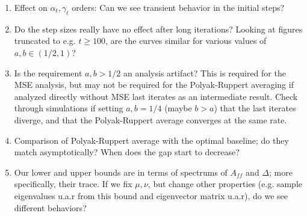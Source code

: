 \begin{enumerate}
\begin{enumerate}
        
        \item Effect on $\alpha_t, \gamma_t$ orders: Can we see transient behavior in the initial steps? 
        \item Do the step sizes really have no effect after long iterations? Looking at figures truncated to e.g. $t \geq 100$, are the curves similar for various values of $a, b \in (1/2, 1)$?
        \item Is the requirement $a, b > 1/2$ an analysis artifact? 
        This is required for the MSE analysis, but may not be required for the Polyak-Ruppert averaging if analyzed directly without MSE last iterates as an intermediate result. 
        Check through simulations if setting $a, b = 1/4$ (maybe $b > a$) that the last iterates diverge, and that the Polyak-Ruppert average converges at the same rate. 
        \item Comparison of Polyak-Ruppert average with the optimal baseline; do they match asymptotically? When does the gap start to decrease?
        \item Our lower and upper bounds are in terms of spectrums of $A_{ff}$ and $\Delta$; more specifically, their trace. 
        If we fix $\mu, \nu$, but change other properties (e.g. sample eigenvalues u.a.r from this bound and eigenvector matrix u.a.r), do we see different behaviors?
    \end{enumerate}
\end{enumerate}
